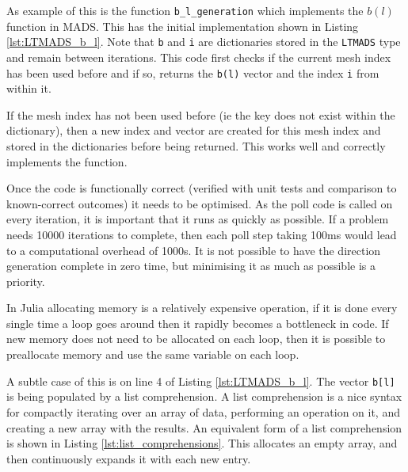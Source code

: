 As example of this is the function \texttt{b\_l\_generation} which implements the $b(l)$ function in MADS. This has the initial implementation shown in Listing \ref{lst:LTMADS_b_l}. Note that \texttt{b} and \texttt{i} are dictionaries stored in the \texttt{LTMADS} type and remain between iterations. This code first checks if the current mesh index has been used before and if so, returns the \texttt{b(l)} vector and the index \texttt{i} from within it.

\begin{figure}[t]
    
\end{figure}

If the mesh index has not been used before (ie the key does not exist within the dictionary), then a new index and vector are created for this mesh index and stored in the dictionaries before being returned. This works well and correctly implements the function.

Once the code is functionally correct (verified with unit tests and comparison to known-correct outcomes) it needs to be optimised. As the poll code is called on every iteration, it is important that it runs as quickly as possible. If a problem needs 10000 iterations to complete, then each poll step taking 100ms would lead to a computational overhead of 1000s. It is not possible to have the direction generation complete in zero time, but minimising it as much as possible is a priority. 

In Julia allocating memory is a relatively expensive operation, if it is done every single time a loop goes around then it rapidly becomes a bottleneck in code. If new memory does not need to be allocated on each loop, then it is possible to preallocate memory and use the same variable on each loop. 

A subtle case of this is on line 4 of Listing \ref{lst:LTMADS_b_l}. The vector \texttt{b[l]} is being populated by a list comprehension. A list comprehension is a nice syntax for compactly iterating over an array of data, performing an operation on it, and creating a new array with the results. An equivalent form of a list comprehension is shown in Listing \ref{lst:list_comprehensions}. This allocates an empty array, and then continuously expands it with each new entry. 

\begin{figure}[t]
    
\end{figure}

